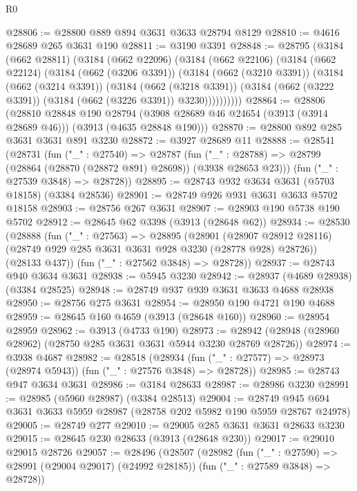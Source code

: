 \begin{lexlean}{R0}
\begin{coremodule}
@28806 := @28800 @889 @894 @3631 @3633 @28794 @8129
@28810 := @4616 @28689 @265 @3631 @190
@28811 := @3190 @3391
@28848 := @28795
    (@3184
      (@662 @28811)
      (@3184
        (@662 @22096)
        (@3184
          (@662 @22106)
          (@3184
            (@662 @22124)
            (@3184
              (@662 (@3206 @3391))
              (@3184
                (@662 (@3210 @3391))
                (@3184
                  (@662 (@3214 @3391))
                  (@3184
                    (@662 (@3218 @3391))
                    (@3184 (@662 (@3222 @3391)) (@3184 (@662 (@3226 @3391)) @3230))))))))))
@28864 := @28806
    (@28810
      @28848
      @190
      @28794
      (@3908 @28689 @46 @24654 (@3913 (@3914 @28689 @46)))
      (@3913 (@4635 @28848 @190)))
@28870 := @28800 @892 @285 @3631 @3631 @891 @3230
@28872 := @3927 @28689 @11
@28888 := @28541
    (@28731
      (fun ("_" : @27540) =>
      @28787
        (fun ("_" : @28788) => @28799 (@28864 (@28870 (@28872 @891) @28698)) (@3938 @28653 @23)))
      (fun ("_" : @27539 @3848) => @28728))
@28895 := @28743 @932 @3634 @3631 (@5703 @18158) (@3384 @28536)
@28901 := @28749 @926 @931 @3631 @3633 @5702 @18158
@28903 := @28756 @267 @3631
@28907 := @28903 @190 @5738 @190 @5702
@28912 := @28645 @62 @3398 (@3913 (@28648 @62))
@28934 := @28530
    (@28888
      (fun ("_" : @27563) =>
      @28895
        (@28901
          (@28907 @28912 @28116)
          (@28749 @929 @285 @3631 @3631 @928 @3230 (@28778 @928) @28726))
        (@28133 @437))
      (fun ("_" : @27562 @3848) => @28728))
@28937 := @28743 @940 @3634 @3631
@28938 := @5945 @3230
@28942 := @28937 (@4689 @28938) (@3384 @28525)
@28948 := @28749 @937 @939 @3631 @3633 @4688 @28938
@28950 := @28756 @275 @3631
@28954 := @28950 @190 @4721 @190 @4688
@28959 := @28645 @160 @4659 (@3913 (@28648 @160))
@28960 := @28954 @28959
@28962 := @3913 (@4733 @190)
@28973 := @28942 (@28948 (@28960 @28962) (@28750 @285 @3631 @3631 @5944 @3230 @28769 @28726))
@28974 := @3938 @4687
@28982 := @28518
    (@28934 (fun ("_" : @27577) => @28973 (@28974 @5943)) (fun ("_" : @27576 @3848) => @28728))
@28985 := @28743 @947 @3634 @3631
@28986 := @3184 @28633
@28987 := @28986 @3230
@28991 := @28985 (@5960 @28987) (@3384 @28513)
@29004 := @28749 @945 @694 @3631 @3633 @5959 @28987 (@28758 @202 @5982 @190 @5959 @28767 @24978)
@29005 := @28749 @277
@29010 := @29005 @285 @3631 @3631 @28633 @3230
@29015 := @28645 @230 @28633 (@3913 (@28648 @230))
@29017 := @29010 @29015 @28726
@29057 := @28496
    (@28507
      (@28982
        (fun ("_" : @27590) => @28991 (@29004 @29017) (@24992 @28185))
        (fun ("_" : @27589 @3848) => @28728))

\end{coremodule}
\end{lexlean}
